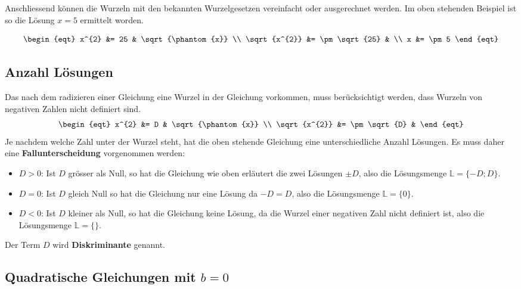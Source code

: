 Anschliessend können die Wurzeln mit den bekannten Wurzelgesetzen vereinfacht oder ausgerechnet werden. Im oben stehenden Beispiel ist so die Lösung $x = 5$ ermittelt worden.

\[\begin{eqt}
         x^{2} &= 25        & \sqrt{\phantom{x}} \\
  \sqrt{x^{2}} &= \pm\sqrt{25} & \\
             x &= \pm 5
\end{eqt}\]

\subsection{Anzahl Lösungen}
Das nach dem radizieren einer Gleichung eine Wurzel in der Gleichung vorkommen, muss berücksichtigt werden, dass Wurzeln von negativen Zahlen nicht definiert sind.
\[\begin{eqt}
         x^{2} &= D           & \sqrt{\phantom{x}} \\
  \sqrt{x^{2}} &= \pm\sqrt{D} &
\end{eqt}\]
Je nachdem welche Zahl unter der Wurzel steht, hat die oben stehende Gleichung eine unterschiedliche Anzahl Lösungen. Es muss daher eine \textbf{Fallunterscheidung} vorgenommen werden:
\begin{itemize}
\item $D>0$: Ist $D$ grösser als Null, so hat die Gleichung wie oben erläutert die zwei Lösungen $\pm D$, also die Lösungsmenge $\mathbb{L} = \{-D;D\}$.
\item $D=0$: Ist $D$ gleich Null so hat die Gleichung nur eine Lösung da $-D = D$, also die Lösungsmenge $\mathbb{L} = \{0\}$.
\item $D<0$: Ist $D$ kleiner als Null, so hat die Gleichung keine Lösung, da die Wurzel einer negativen Zahl nicht definiert ist, also die Lösungsmenge $\mathbb{L} = \{\}$.
\end{itemize}
Der Term $D$ wird \textbf{Diskriminante} genannt.

\subsection{Quadratische Gleichungen mit $b=0$}

